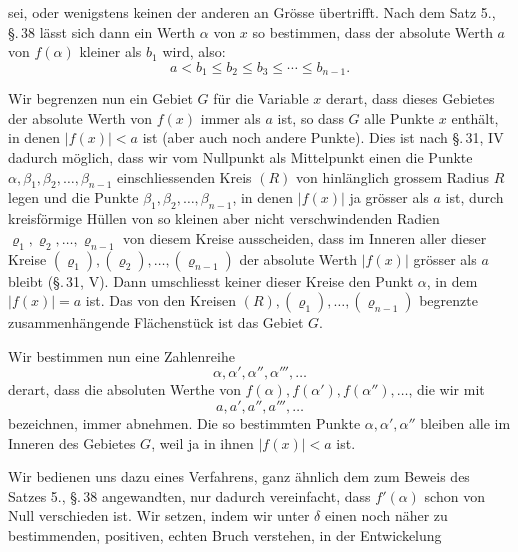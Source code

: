 
sei, oder wenigstens keinen der anderen an Grösse übertrifft. Nach dem Satz 5., \S.\,38 lässt sich dann ein Werth $\alpha$ von $x$ so bestimmen, dass der absolute Werth $a$ von $f(\alpha)$ kleiner als $b_1$ wird, also:
\begin{equation}
 a<b_1\le b_2\le b_3\le\cdots\le b_{n-1}.
\tag{5}
\end{equation}

Wir begrenzen nun ein Gebiet $G$ für die Variable $x$ derart, dass  dieses Gebietes der absolute Werth von $f(x)$ immer  als $a$ ist, so dass $G$ alle Punkte $x$ enthält, in denen $|f(x)|<a$ ist (aber auch noch andere Punkte). Dies ist nach \S.\,31, IV dadurch möglich, dass wir vom Nullpunkt als Mittelpunkt einen die Punkte $\alpha,\beta_1,\beta_2,
\ldots,\beta_{n-1}$ einschliessenden Kreis $(R)$ von hinlänglich grossem Radius $R$ legen und die Punkte $\beta_1,\beta_2,
\ldots,\beta_{n-1}$, in denen $|f(x)|$ ja grösser als $a$ ist, durch kreisförmige Hüllen von so kleinen aber nicht verschwindenden Radien $\varrho_1,\varrho_2,
\ldots,\varrho_{n-1}$ von diesem Kreise ausscheiden, dass im Inneren aller dieser Kreise $(\varrho_1),(\varrho_2),\ldots,(\varrho_{n-1})$ der absolute Werth $|f(x)|$ grösser als $a$ bleibt (\S.\,31, V). Dann umschliesst keiner dieser Kreise den Punkt $\alpha$, in dem $|f(x)|=a$ ist. Das von den Kreisen $(R),(\varrho_1),\ldots,(\varrho_{n-1})$ begrenzte zusammenhängende Flächenstück ist das Gebiet $G$.



Wir bestimmen nun eine Zahlenreihe
\[
 \alpha,\alpha',\alpha'',\alpha''',\ldots
\]
derart, dass die absoluten Werthe von $f(\alpha),f(\alpha'),f(\alpha''),\ldots$, die wir mit
\[
 a,a',a'',a''',\ldots
\]
bezeichnen, immer abnehmen. Die so bestimmten Punkte $\alpha,\alpha',\alpha''$ bleiben alle im Inneren des Gebietes $G$, weil ja in ihnen $|f(x)|<a$ ist.

Wir bedienen uns dazu eines Verfahrens, ganz ähnlich dem zum Beweis des Satzes 5., \S.\,38 angewandten, nur dadurch vereinfacht, dass $f'(\alpha)$ schon von Null verschieden ist. Wir setzen, indem wir unter $\delta$ einen noch näher zu bestimmenden, positiven, echten Bruch verstehen, in der Entwickelung

